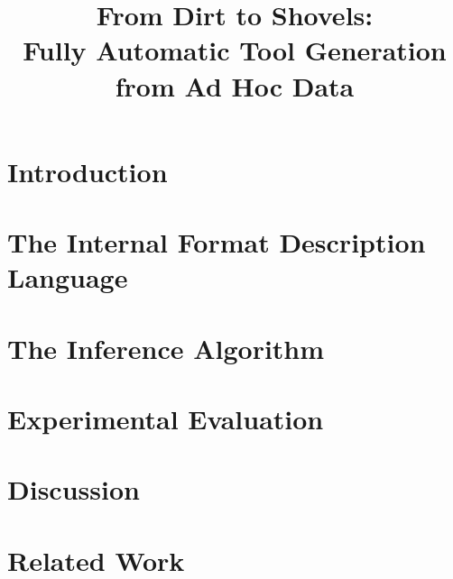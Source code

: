 \documentclass[nocopyrightspace]{sigplanconf}
\begin{document}
\title{From Dirt to Shovels:\\
       Fully Automatic Tool Generation from Ad Hoc Data}

       {}
       {}
       {}


\maketitle{}

\begin{abstract}  

\end{abstract}

\section {Introduction}
\label{sec:intro}


\section{The Internal Format Description Language}
\label{sec:review}


\section{The Inference Algorithm}
\label{sec:inference}


\section{Experimental Evaluation}
\label{sec:exp}


\section{Discussion}
\label{sec:discussion}


\section{Related Work}
\label{sec:related}

\end{document}
